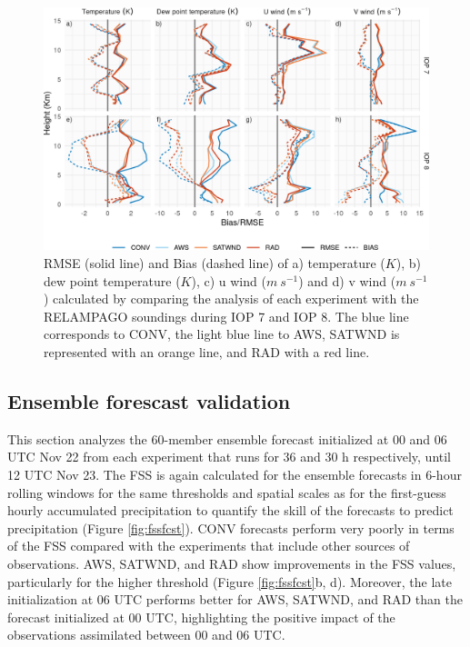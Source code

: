 \documentclass[preprint, 3p, authoryear,review, 12pt]{elsarticle} %
\begin{document}
\begin{figure}[ht]

{\centering \includegraphics{../figures/soundings-1} 

}

\caption{RMSE (solid line) and Bias (dashed line) of a) temperature (\(K\)), b) dew point temperature (\(K\)), c) u wind (\(m\ s^{-1}\)) and d) v wind (\(m\ s^{-1}\)) calculated by comparing the analysis of each experiment with the RELAMPAGO soundings during IOP 7 and IOP 8. The blue line corresponds to CONV, the light blue line to AWS, SATWND is represented with an orange line, and RAD with a red line.}\label{fig:soundings}
\end{figure}

\hypertarget{ensemble-forescast-validation}{%
\subsection{Ensemble forescast validation}\label{ensemble-forescast-validation}}

This section analyzes the 60-member ensemble forecast initialized at 00 and 06 UTC Nov 22 from each experiment that runs for 36 and 30 h respectively, until 12 UTC Nov 23. The FSS is again calculated for the ensemble forecasts in 6-hour rolling windows for the same thresholds and spatial scales as for the first-guess hourly accumulated precipitation to quantify the skill of the forecasts to predict precipitation (Figure \ref{fig:fssfcst}). CONV forecasts perform very poorly in terms of the FSS compared with the experiments that include other sources of observations. AWS, SATWND, and RAD show improvements in the FSS values, particularly for the higher threshold (Figure \ref{fig:fssfcst}b, d). Moreover, the late initialization at 06 UTC performs better for AWS, SATWND, and RAD than the forecast initialized at 00 UTC, highlighting the positive impact of the observations assimilated between 00 and 06 UTC.
\end{document}
